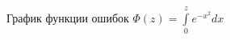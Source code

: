 \documentclass[12pt, a4paper]{article}
\begin{document}
\fboxsep=0mm%
\fboxrule=2pt%
\begin{figure}[H]
\centering
\begin{minipage}[t]{.4\textwidth}
\begin{figure}[H]
  \centering
  \caption{График функции ошибок $\Phi(z) = \int\limits_0^{z} e^{-x^2}dx$}
  \label{fig:err_int}
  \end{figure}%
\end{minipage}\hspace{10pt}%
\begin{minipage}[t]{.4\textwidth}%
\begin{figure}[H]
  \centering

\end{figure}
\end{minipage}
\end{figure}
\end{document}
